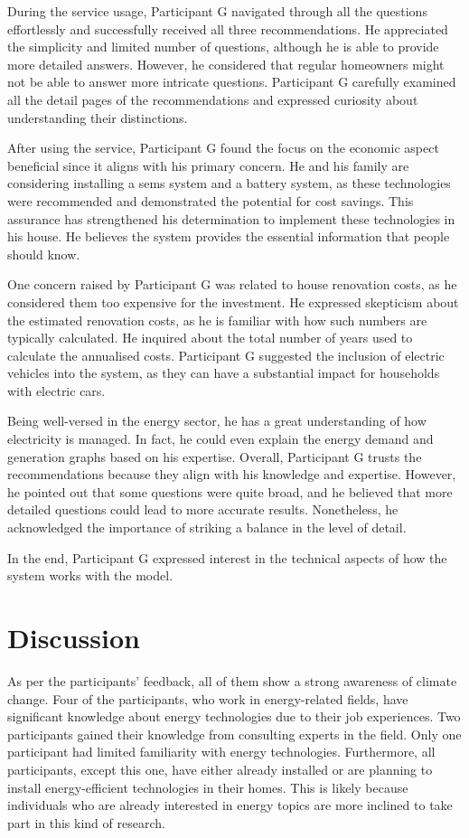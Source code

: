During the service usage, 
Participant G navigated through all the questions effortlessly and successfully received all three recommendations. 
He appreciated the simplicity and limited number of questions, 
although he is able to provide more detailed answers. 
However, he considered that regular homeowners might not be able to answer more intricate questions. 
Participant G carefully examined all the detail pages of the recommendations and expressed curiosity about understanding their distinctions.

After using the service, 
Participant G found the focus on the economic aspect beneficial since it aligns with his primary concern. 
He and his family are considering installing a \gls{sems} system and a battery system, 
as these technologies were recommended and demonstrated the potential for cost savings. 
This assurance has strengthened his determination to implement these technologies in his house. 
He believes the system provides the essential information that people should know. 

One concern raised by Participant G was related to house renovation costs, 
as he considered them too expensive for the investment. 
He expressed skepticism about the estimated renovation costs, 
as he is familiar with how such numbers are typically calculated. 
He inquired about the total number of years used to calculate the annualised costs.
Participant G suggested the inclusion of electric vehicles into the system, 
as they can have a substantial impact for households with electric cars. 

Being well-versed in the energy sector, he has a great understanding of how electricity is managed. 
In fact, he could even explain the energy demand and generation graphs based on his expertise.
Overall, Participant G trusts the recommendations because they align with his knowledge and expertise. 
However, he pointed out that some questions were quite broad, and he believed that more detailed questions could lead to more accurate results. 
Nonetheless, he acknowledged the importance of striking a balance in the level of detail.

In the end, Participant G expressed interest in the technical aspects of how the system works with the model. 


\section{Discussion}

As per the participants' feedback, 
all of them show a strong awareness of climate change. 
Four of the participants, who work in energy-related fields, have significant knowledge about energy technologies due to their job experiences. 
Two participants gained their knowledge from consulting experts in the field. 
Only one participant had limited familiarity with energy technologies. 
Furthermore, all participants, except this one, have either already installed or are planning to install energy-efficient technologies in their homes. 
This is likely because individuals who are already interested in energy topics are more inclined to take part in this kind of research.


